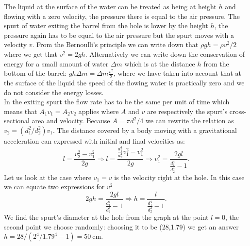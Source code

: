 \solueng
The liquid at the surface of the water can be treated as being at height $h$ and flowing with a zero velocity, the pressure there is equal to the air pressure. The spurt of water exiting the barrel from the hole is lower by the height $h$, the pressure again has to be equal to the air pressure but the spurt moves with a velocity $v$. From the Bernoulli’s principle we can write down that $\rho g h = \rho v^2/2$ where we get that $v^2=2gh$. Alternatively we can write down the conservation of energy for a small amount of water $\Delta m$ which is at the distance $h$ from the bottom of the barrel: $ g h \Delta m = \Delta m \frac{v^2}{2}$, where we have taken into account that at the surface of the liquid the speed of the flowing water is practically zero and we do not consider the energy losses.\\
In the exiting spurt the flow rate has to be the same per unit of time which means that $A_1v_1=A_2v_2$ applies where $A$ and $v$ are respectively the spurt’s cross-sectional area and velocity. Because $A=\pi d^2/4$ we can rewrite the relation as $v_2=(d_1^2/d_2^2)v_1$. The distance covered by a body moving with a gravitational acceleration can expressed with initial and final velocities as:
$$l=\frac{v_2^2-v_1^2}{2g} \Rightarrow l=\frac{\frac{d_1^4}{d_2^4}v_1^2-v_1^2}{2g} \Rightarrow v_1^2=\frac{2gl}{\frac{d_1^4}{d_2^4}-1}.$$
Let us look at the case where $v_1=v$ is the velocity right at the hole. In this case we can equate two expressions for $v^2$ 
$$2gh=\frac{2gl}{\frac{d_1^4}{d_2^4}-1}\Rightarrow h=\frac{l}{\frac{d_1^4}{d_2^4}-1}.$$
We find the spurt’s diameter at the hole from the graph at the point $l=0$, the second point we choose randomly: choosing it to be (28,\num{1.79}) we get an answer $h=28/(2^4/\num{1.79}^4-1)=\SI{50}{\cm}$.
\probend
